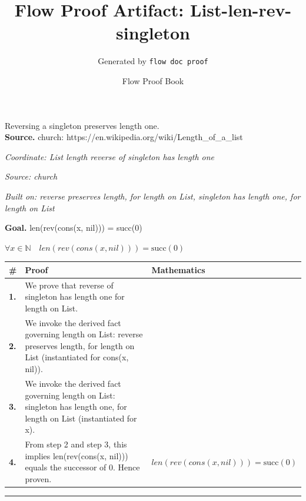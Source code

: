 \documentclass[11pt]{article}
\title{Flow Proof Artifact: List-len-rev-singleton}
\author{Generated by \texttt{flow doc proof}}
\date{Flow Proof Book}
\theoremstyle{definition}
\begin{document}
\maketitle
Reversing a singleton preserves length one.\\[0.5em]
\textbf{Source.} church: https://en.wikipedia.org/wiki/Length\_of\_a\_list\\[0.5em]
\bigskip
{}\par
\smallskip\noindent\textit{Coordinate: List \cdot length \cdot reverse of singleton has length one}\par
\smallskip\noindent\textit{Source: church}\par
\smallskip\noindent\textit{Built on: reverse preserves length, for length on List, singleton has length one, for length on List}\par
\medskip
\noindent\textbf{Goal.} len(rev(cons(x, nil))) = succ(0)\par
\noindent$\displaystyle \forall x \in \mathbb{N}\quad len(rev(cons(x, nil))) = \mathrm{succ}(0)$\par
\medskip
\noindent
\begin{tabular}{@{} >{\raggedright\arraybackslash}p{} >{\raggedright\arraybackslash}p{} >{\raggedleft\arraybackslash}p{} @{}}
\textbf{\#} & \textbf{Proof} & \textbf{Mathematics} \\
\midrule
\textbf{1.} & We prove that reverse of singleton has length one for length on List. & \\[0.45em]
\textbf{2.} & We invoke the derived fact governing length on List: reverse preserves length, for length on List (instantiated for cons(x, nil)). & \\[0.45em]
\textbf{3.} & We invoke the derived fact governing length on List: singleton has length one, for length on List (instantiated for x). & \\[0.45em]
\textbf{4.} & From step 2 and step 3, this implies len(rev(cons(x, nil))) equals the successor of 0. Hence proven. & $\displaystyle len(rev(cons(x, nil))) = \mathrm{succ}(0)$ \\[0.45em]
\bottomrule
\end{tabular}
\label{thm:List-length-reverse_of_singleton_has_length_one}
\par\medskip\hrule
\end{document}

